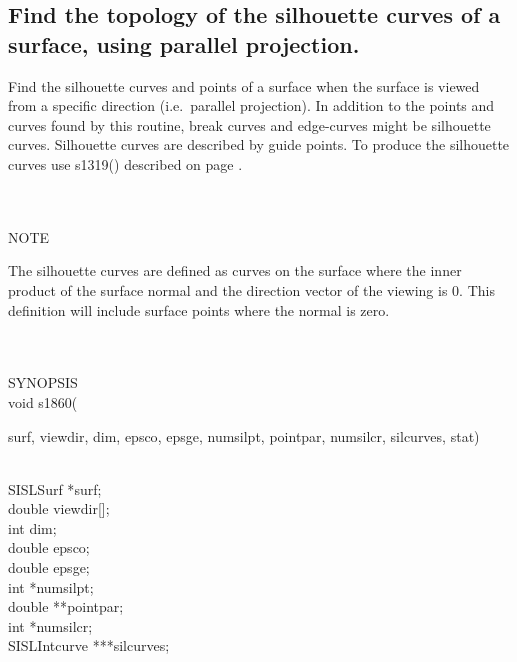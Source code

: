 \subsection{Find the topology of the silhouette curves of a surface,
using parallel projection.}
\begin{minipg1}
  Find the silhouette curves and points of a surface when the surface is viewed
  from a specific direction (i.e.\ parallel projection).
  In addition to the points and curves found by this routine, break
  curves and edge-curves might be silhouette curves.
  Silhouette curves are described by guide points.
  To produce the silhouette curves use s1319() described on page \pageref{s1319}.
\end{minipg1} \\ \\
NOTE\\
\>     \begin{minipg6}
The silhouette curves are defined as curves on the surface where the inner product of the surface normal and the direction vector of the viewing is 0. This definition will include surface points where the normal is zero.
\end{minipg6}\\ \\
SYNOPSIS\\
        \>void s1860(\begin{minipg3}
                {\fov surf}, {\fov viewdir}, {\fov dim}, {\fov epsco}, {\fov epsge}, {\fov numsilpt}, {\fov pointpar}, {\fov numsilcr}, {\fov silcurves},
                {\fov stat})
                \end{minipg3}\\[0.3ex]
                \>\>    SISLSurf        \>      *{\fov surf};\\
                \>\>    double  \>      {\fov viewdir}[];\\
                \>\>    int     \>      {\fov dim};\\
                \>\>    double  \>      {\fov epsco};\\
                \>\>    double  \>      {\fov epsge};\\
                \>\>    int     \>      *{\fov numsilpt};\\
                \>\>    double  \>      **{\fov pointpar};\\
                \>\>    int     \>      *{\fov numsilcr};\\
                \>\>    SISLIntcurve\>  ***{\fov silcurves};\\
